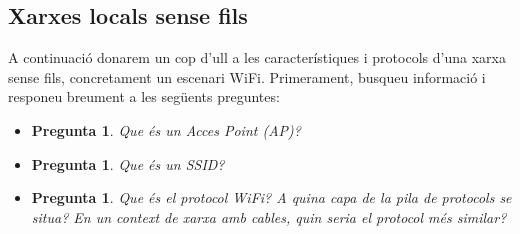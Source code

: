 \documentclass[12pt,a4paper]{article}
\newcounter{exercises}
\newtheorem{exer}[exercises]{Pregunta}
\begin{document}
\subsection{Xarxes locals sense fils}
A continuació donarem un cop d'ull a les característiques i protocols d'una xarxa sense fils, concretament un escenari WiFi. Primerament, busqueu informació i responeu breument a les següents preguntes:

\begin{itemize}
\item \begin{exer} Que és un Acces Point (AP)?\end{exer}
\item \begin{exer} Que és un SSID? \end{exer}
\item \begin{exer} Que és el protocol WiFi? A quina capa de la pila de protocols se situa? En un context de xarxa amb cables, quin seria el protocol més similar?\end{exer}
\end{itemize}
\end{document}
